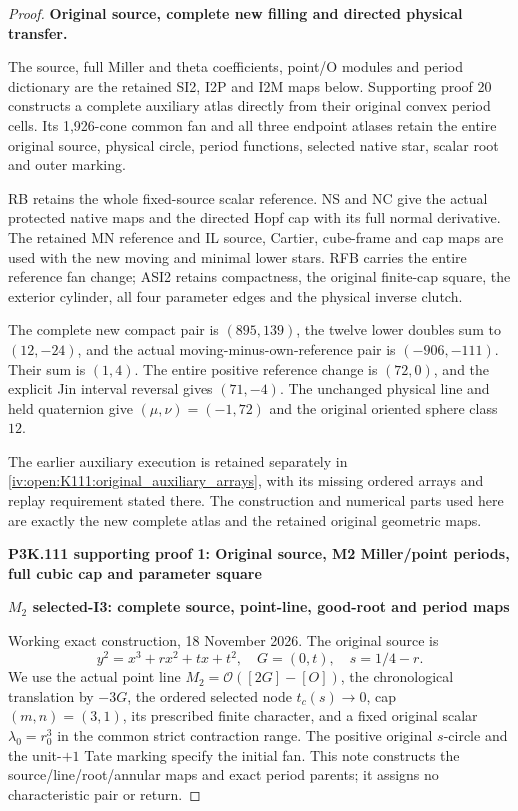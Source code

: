 \begin{proof}
\noindent\textbf{Original source, complete new filling and directed physical transfer.}\par\smallskip
The source, full Miller and theta coefficients, point/O modules and
period dictionary are the retained SI2, I2P and I2M maps below.  Supporting
proof 20 constructs a complete auxiliary atlas directly from their
original convex period cells.  Its 1,926-cone common fan and all three
endpoint atlases retain the entire original source, physical circle,
period functions, selected native star, scalar root and outer marking.

RB retains the whole fixed-source scalar reference.  NS and NC give
the actual protected native maps and the directed Hopf cap with its
full normal derivative.  The retained MN reference and IL source,
Cartier, cube-frame and cap maps are used with the new moving and
minimal lower stars.  RFB carries the entire reference fan change;
ASI2 retains compactness, the original finite-cap square, the exterior
cylinder, all four parameter edges and the physical inverse clutch.

The complete new compact pair is $(895,139)$, the twelve lower doubles
sum to $(12,-24)$, and the actual moving-minus-own-reference pair is
$(-906,-111)$.  Their sum is $(1,4)$.  The entire positive reference
change is $(72,0)$, and the explicit Jin interval reversal gives
$(71,-4)$.  The unchanged physical line and held quaternion give
$(\mu,\nu)=(-1,72)$ and the original oriented sphere class $12$.

The earlier auxiliary execution is retained separately in
\cref{iv:open:K111:original_auxiliary_arrays}, with its missing ordered
arrays and replay requirement stated there.  The construction and
numerical parts used here are exactly the new complete atlas and the
retained original geometric maps.

\par\bigskip\noindent\textbf{P3K.111 supporting proof 1: Original source, M2 Miller/point periods, full cubic cap and parameter square}\par\nobreak
\par

\medskip\noindent\textbf{\(M_{2}\) selected-I3: complete source, point-line, good-root and period maps}

\par\nobreak

Working exact construction, 18 November 2026. The original source is
\[
 y^2=x^3+rx^2+tx+t^2,\quad G=(0,t),\quad s=1/4-r.
\]
We use the actual point line \(M_2=\mathcal O([2G]-[O])\), the
chronological translation by \(-3G\), the ordered selected node
\(t_c(s)\to0\), cap \((m,n)=(3,1)\), its prescribed finite character,
and a fixed original scalar \(\lambda_0=r_0^3\) in the common strict
contraction range. The positive original \(s\)-circle and the
unit-\(+1\) Tate marking specify the initial fan. This note constructs
the source/line/root/annular maps and exact period parents; it assigns
no characteristic pair or return.


\end{proof}
